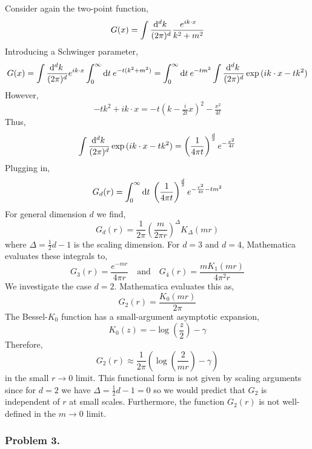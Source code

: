 \documentclass[12pt]{article}
\begin{document}
Consider again the two-point function,
\begin{align*}
G(x) =  \int \frac{\mathrm{d}^{d} k \:}{(2\pi)^d} \frac{e^{i k \cdot x}}{k^2 + m^2}
\end{align*}
Introducing a Schwinger parameter,
\begin{align*}
G(x) = \int \frac{\mathrm{d}^{d} k \:}{(2\pi)^d} e^{i k \cdot x} \int_0^{\infty} \mathrm{d}t \: e^{- t(k^2 + m^2)} = \int_0^{\infty} \mathrm{d}t \: e^{-t m^2} \int \frac{\mathrm{d}^{d} k \:}{(2\pi)^d} \exp{(i k \cdot x - t k^2)}
\end{align*}
However,
\[ - t k^2 + i k \cdot x = - t (k - \tfrac{i}{2t} x)^2 - \tfrac{x^2}{4 t} \]
Thus,
\[ \int \frac{\mathrm{d}^{d} k \:}{(2\pi)^d} \exp{(i k \cdot x - t k^2)} = \left( \frac{1}{4 \pi t} \right)^{\frac{d}{2}} e^{- \frac{x^2}{4 t}} \]
Plugging in,
\begin{align*}
G_d(r) = \int_0^{\infty} \mathrm{d}t \: \left( \frac{1}{4 \pi t} \right)^{\frac{d}{2}} e^{- \frac{r^2}{4 t} - t m^2}
\end{align*}
For general dimension $d$ we find,
\[ G_d(r) = \frac{1}{2\pi} \left(\frac{m}{2 \pi r} \right)^{\Delta} K_{\Delta}(mr) \]
where $\Delta = \tfrac{1}{2} d - 1$ is the scaling dimension.  
For $d = 3$ and $d = 4$, Mathematica evaluates these integrals to,
\[ G_3(r) = \frac{e^{-mr}}{4 \pi r} \quad \text{and} \quad G_4(r) = \frac{m K_1(mr)}{4 \pi^2 r} \]
We investigate the case $d = 2$. Mathematica evaluates this as,
\[ G_2(r) = \frac{K_0(mr)}{2 \pi} \]
The Bessel-$K_0$ function has a small-argument asymptotic expansion, 
\[ K_0(z) = - \log{\left(\frac{z}{2}\right)} - \gamma \]
Therefore,
\[ G_2(r) \approx \frac{1}{2 \pi} \left( \log{\left(\frac{2}{mr}\right)} - \gamma \right) \]
in the small $r \to 0$ limit. This functional form is not given by scaling arguments since for $d = 2$ we have $\Delta = \tfrac{1}{2} d - 1 = 0$ so we would predict that $G_2$ is independent of $r$ at small scales. Furthermore, the function $G_2(r)$ is not well-defined in the $m \to 0$ limit. 

\subsubsection{Problem 3.}
\end{document}
